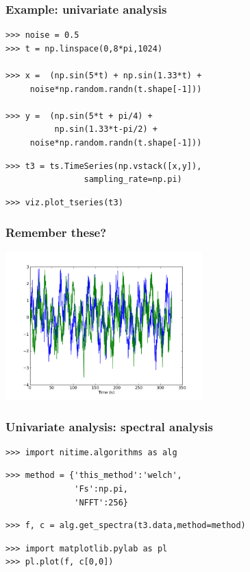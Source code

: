 \documentclass{beamer}
\begin{document}
\begin{frame}[fragile]
\frametitle{Example: univariate analysis}

\pause
\begin{lstlisting}
>>> noise = 0.5
>>> t = np.linspace(0,8*pi,1024) 

>>> x =  (np.sin(5*t) + np.sin(1.33*t) +  
     noise*np.random.randn(t.shape[-1]))

>>> y =  (np.sin(5*t + pi/4) + 
          np.sin(1.33*t-pi/2) +
     noise*np.random.randn(t.shape[-1]))
\end{lstlisting}

\pause
\begin{lstlisting}
>>> t3 = ts.TimeSeries(np.vstack([x,y]),
                sampling_rate=np.pi)
\end{lstlisting}

\pause
\begin{lstlisting}
>>> viz.plot_tseries(t3)
\end{lstlisting}
\end{frame}

\begin{frame}
\frametitle{Remember these?}
\includegraphics[height=5.7cm]{figures/outa_phase_tseries}
\end{frame}

\begin{frame}[fragile]
\frametitle{Univariate analysis: spectral analysis }
\begin{lstlisting}
>>> import nitime.algorithms as alg
\end{lstlisting}
\pause
\begin{lstlisting}
>>> method = {'this_method':'welch',
              'Fs':np.pi,
              'NFFT':256}
\end{lstlisting}
\pause
\begin{lstlisting}
>>> f, c = alg.get_spectra(t3.data,method=method)
\end{lstlisting}
\pause
\begin{lstlisting}
>>> import matplotlib.pylab as pl 
>>> pl.plot(f, c[0,0])
\end{lstlisting}
\end{frame}
\end{document}
